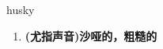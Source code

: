 
\begin{frame}
{\huge husky}
\begin{center}
\begin{enumerate}\Large
  \item \textbf{(尤指声音)沙哑的，粗糙的}
\end{enumerate}
\end{center}
\end{frame}
